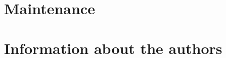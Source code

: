 \documentclass{article}
\newcommand{\labelsec}[1]{\label{sec:#1}}
\begin{document}
\section{Maintenance}
\labelsec{Maintenance}


\section{Information about the authors}
\labelsec{Author}
\end{document}
